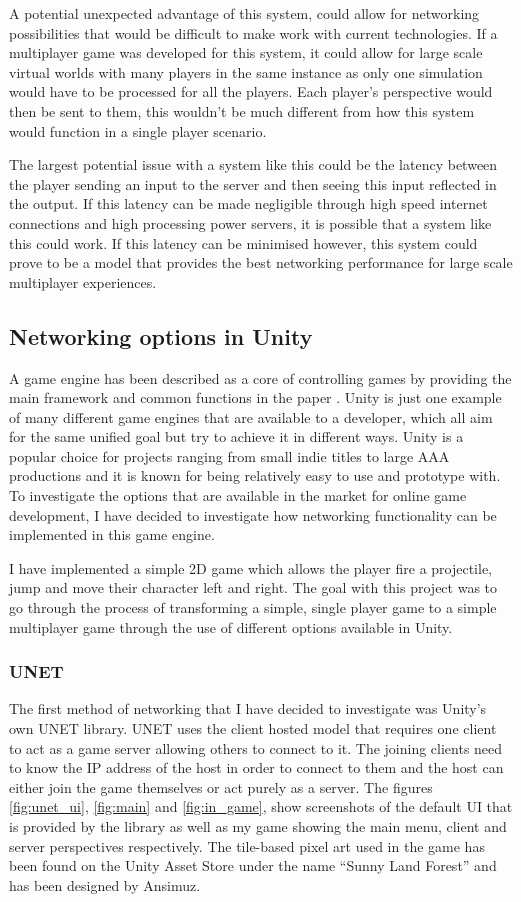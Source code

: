 A potential unexpected advantage of this system, could allow for networking possibilities that would be difficult to make work with current technologies. If a multiplayer game was developed for this system, it could allow for large scale virtual worlds with many players in the same instance as only one simulation would have to be processed for all the players. Each player's perspective would then be sent to them, this wouldn't be much different from how this system would function in a single player scenario.

The largest potential issue with a system like this could be the latency between the player sending an input to the server and then seeing this input reflected in the output. If this latency can be made negligible through high speed internet connections and high processing power servers, it is possible that a system like this could work. If this latency can be minimised however, this system could prove to be a model that provides the best networking performance for large scale multiplayer experiences.


\subsection{Networking options in Unity}
A game engine has been described as a core of controlling games by providing the main framework and common functions in the paper . Unity is just one example of many different game engines that are available to a developer, which all aim for the same unified goal but try to achieve it in different ways. Unity is a popular choice for projects ranging from small indie titles to large AAA productions and it is known for being relatively easy to use and prototype with. To investigate the options that are available in the market for online game development, I have decided to investigate how networking functionality can be implemented in this game engine.

I have implemented a simple 2D game which allows the player fire a projectile, jump and move their character left and right. The goal with this project was to go through the process of transforming a simple, single player game to a simple multiplayer game through the use of different options available in Unity.

\subsubsection{UNET}
The first method of networking that I have decided to investigate was Unity's own UNET library. UNET uses the client hosted model that requires one client to act as a game server allowing others to connect to it. The joining clients need to know the IP address of the host in order to connect to them and the host can either join the game themselves or act purely as a server. The figures \ref{fig:unet_ui}, \ref{fig:main} and \ref{fig:in_game}, show screenshots of the default UI that is provided by the library as well as my game showing the main menu, client and server perspectives respectively. The tile-based pixel art used in the game has been found on the Unity Asset Store under the name ``Sunny Land Forest'' and has been designed by Ansimuz.


